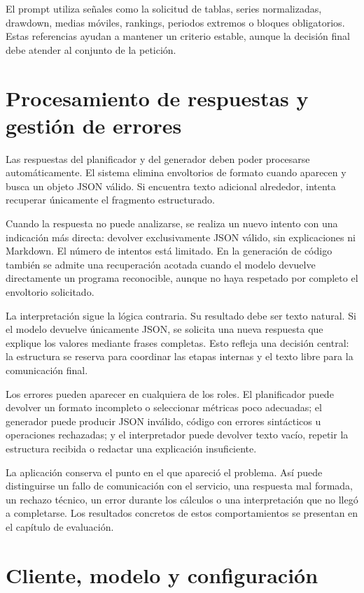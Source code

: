 El prompt utiliza señales como la solicitud de tablas, series normalizadas, drawdown, medias móviles, rankings, periodos extremos o bloques obligatorios. Estas referencias ayudan a mantener un criterio estable, aunque la decisión final debe atender al conjunto de la petición.

\section{Procesamiento de respuestas y gestión de errores}

Las respuestas del planificador y del generador deben poder procesarse automáticamente. El sistema elimina envoltorios de formato cuando aparecen y busca un objeto JSON válido. Si encuentra texto adicional alrededor, intenta recuperar únicamente el fragmento estructurado.

Cuando la respuesta no puede analizarse, se realiza un nuevo intento con una indicación más directa: devolver exclusivamente JSON válido, sin explicaciones ni Markdown. El número de intentos está limitado. En la generación de código también se admite una recuperación acotada cuando el modelo devuelve directamente un programa reconocible, aunque no haya respetado por completo el envoltorio solicitado.

La interpretación sigue la lógica contraria. Su resultado debe ser texto natural. Si el modelo devuelve únicamente JSON, se solicita una nueva respuesta que explique los valores mediante frases completas. Esto refleja una decisión central: la estructura se reserva para coordinar las etapas internas y el texto libre para la comunicación final.

Los errores pueden aparecer en cualquiera de los roles. El planificador puede devolver un formato incompleto o seleccionar métricas poco adecuadas; el generador puede producir JSON inválido, código con errores sintácticos u operaciones rechazadas; y el interpretador puede devolver texto vacío, repetir la estructura recibida o redactar una explicación insuficiente.

La aplicación conserva el punto en el que apareció el problema. Así puede distinguirse un fallo de comunicación con el servicio, una respuesta mal formada, un rechazo técnico, un error durante los cálculos o una interpretación que no llegó a completarse. Los resultados concretos de estos comportamientos se presentan en el capítulo de evaluación.

\section{Cliente, modelo y configuración}

